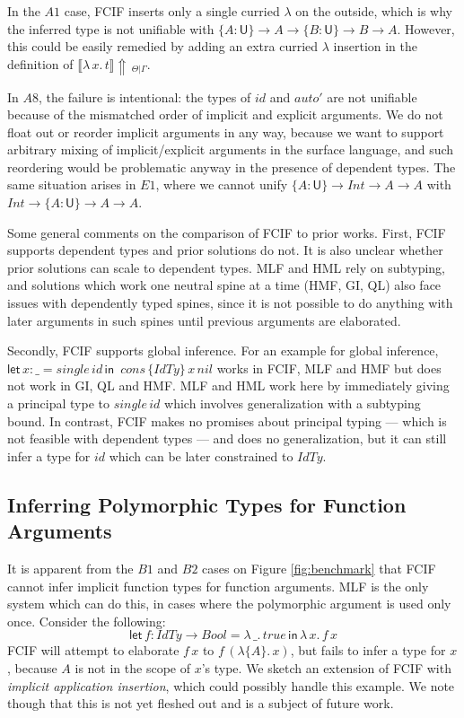 \documentclass[acmsmall,review,anonymous,prologue,dvipsnames]{acmart}\settopmatter{printfolios=true,printccs=false,printacmref=false}
\newcommand{\slet}{\boldsymbol{\mathsf{let}}}
\renewcommand{\sin}{\boldsymbol{\mathsf{in}}}
\renewcommand{\U}{\mathsf{U}}
\newcommand{\einfer}[3]{\llbracket#1\rrbracket\!\Uparrow\,_{#2|#3}}
\theoremstyle{remark}
\begin{document}
In the $A1$ case, FCIF inserts only a single curried $\lambda$ on the outside,
which is why the inferred type is not unifiable with $\{A : \U\}\to A \to \{B :
\U\} \to B \to A$. However, this could be easily remedied by adding an extra
curried $\lambda$ insertion in the definition of
$\einfer{\lambda\,x.\,t}{\Theta}{\Gamma}$.

In $A8$, the failure is intentional: the types of $id$ and $auto'$ are not
unifiable because of the mismatched order of implicit and explicit arguments. We
do not float out or reorder implicit arguments in any way, because we want to
support arbitrary mixing of implicit/explicit arguments in the surface language,
and such reordering would be problematic anyway in the presence of dependent
types. The same situation arises in $E1$, where we cannot unify $\{A : \U\}\to
Int \to A \to A$ with $Int \to \{A : \U\}\to A \to A$.

Some general comments on the comparison of FCIF to prior works. First, FCIF
supports dependent types and prior solutions do not. It is also unclear whether
prior solutions can scale to dependent types. MLF and HML rely on subtyping, and
solutions which work one neutral spine at a time (HMF, GI, QL) also face issues
with dependently typed spines, since it is not possible to do anything with
later arguments in such spines until previous arguments are elaborated.

Secondly, FCIF supports global inference. For an example for global inference,
$\slet\,x : \_ = single\,id\,\sin\,$ $cons\,\{IdTy\}\,x\,nil$ works in FCIF, MLF
and HMF but does not work in GI, QL and HMF. MLF and HML work here by
immediately giving a principal type to $single\,id$ which involves
generalization with a subtyping bound. In contrast, FCIF makes no promises about
principal typing --- which is not feasible with dependent types --- and does no
generalization, but it can still infer a type for $id$ which can be later
constrained to $IdTy$.


\subsection{Inferring Polymorphic Types for Function Arguments}
\label{sec:appinsert}

It is apparent from the $B1$ and $B2$ cases on Figure \ref{fig:benchmark} that FCIF
cannot infer implicit function types for function arguments.  MLF is the only
system which can do this, in cases where the polymorphic argument is used only
once. Consider the following:
\[
  \slet\,f : IdTy \to Bool = \lambda\,\_.\,true\,\sin\,\lambda\,x.\,f\,x
  \]
FCIF will attempt to elaborate $f\,x$ to $f\,(\lambda\{A\}.\,x)$, but fails to
infer a type for $x$, because $A$ is not in the scope of $x$'s type. We sketch
an extension of FCIF with \emph{implicit application insertion}, which could
possibly handle this example. We note though that this is not yet fleshed out
and is a subject of future work.
\end{document}
